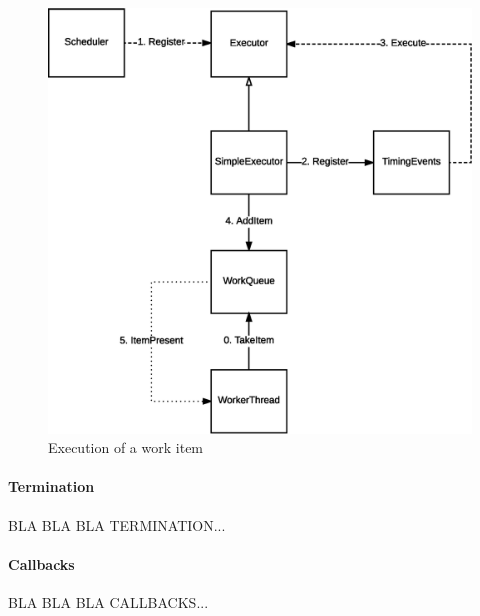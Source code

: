 \begin{figure}[H]
\centering
\includegraphics[scale=0.5,keepaspectratio]{images/solution/app/backend/scheduling-execution.eps}
\caption{Execution of a work item}
\label{fig:schedule-execution}
\end{figure}

\paragraph{Termination}

BLA BLA BLA TERMINATION...

\paragraph{Callbacks}

BLA BLA BLA CALLBACKS...

